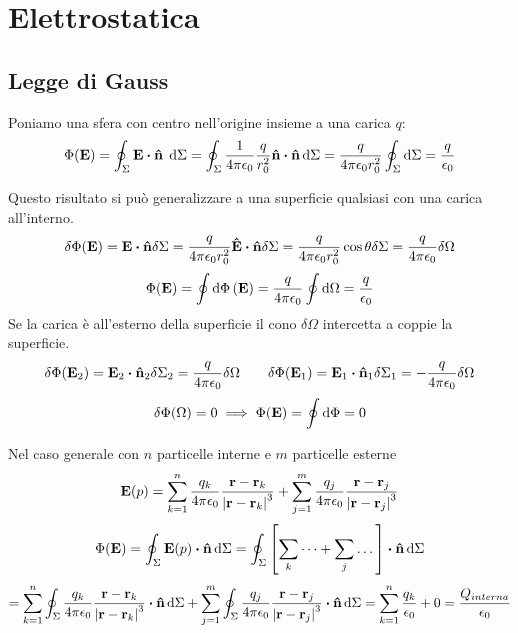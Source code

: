 \documentclass[12pt,a4paper]{article}
\begin{document}
\section{Elettrostatica}
\subsection{Legge di Gauss }
Poniamo una sfera con centro nell'origine insieme a una carica $q$:
\begin{equation*}
    \Phi(\vb{E})= \oint_\Sigma \vb{E}\vdot \vu{n} \; \dd{\Sigma} = \oint_\Sigma \frac{1}{4\pi\epsilon_0}\frac{q}{r_0^2}\vu{n}\vdot\vu{n}\dd{\Sigma}= 
    \frac{q}{4\pi\epsilon_0r_0^2}\oint_\Sigma \dd{\Sigma} = \frac{q}{\epsilon_0}
\end{equation*}

Questo risultato si può generalizzare a una superficie qualsiasi con una carica all'interno.
\begin{equation*}
    \delta\Phi(\vb{E})= \vb{E}\vdot\vu{n} \delta \Sigma = \frac{q}{4\pi\epsilon_0r_0^2}\vu{E}\vdot\vu{n} \delta\Sigma= 
     \frac{q}{4\pi\epsilon_0r_0^2}\cos \theta \delta\Sigma=  \frac{q}{4\pi\epsilon_0} \delta\Omega
\end{equation*}
\begin{equation*}
    \Phi(\vb{E})= \oint \dd{\Phi}(\vb{E})=\frac{q}{4\pi\epsilon_0} \oint\dd{\Omega} = \frac{q}{\epsilon_0}
\end{equation*}
Se la carica è all'esterno della superficie il cono $\delta\Omega$ intercetta a coppie la superficie. 
\begin{equation*}
    \delta\Phi(\vb{E}_2)= \vb{E}_2 \vdot\vu{n}_2 \delta\Sigma_2 =  \frac{q}{4\pi\epsilon_0} \delta\Omega
    \quad \quad \delta\Phi(\vb{E}_1)= \vb{E}_1 \vdot\vu{n}_1 \delta\Sigma_1 =  - \frac{q}{4\pi\epsilon_0} \delta\Omega
\end{equation*}
\begin{equation*}
    \delta\Phi(\Omega)= 0 \implies \Phi(\vb{E})= \oint \dd{\Phi}=0
\end{equation*}

Nel caso generale con $n$ particelle interne e $m$ particelle esterne
\begin{equation*}
    \vb{E}(p)= \sum_{k=1}^{n} \frac{q_k}{4\pi\epsilon_0} \frac{\vb{r}-\vb{r}_k}{\abs{\vb{r}-\vb{r}_k}^3} +
    \sum_{j=1}^{m} \frac{q_j}{4\pi\epsilon_0} \frac{\vb{r}-\vb{r}_j}{\abs{\vb{r}-\vb{r}_j}^3} 
\end{equation*}
\begin{equation*}
    \Phi(\vb{E})= \oint_\Sigma \vb{E}(p)\vdot\vu{n} \dd{\Sigma} = \oint_\Sigma \left[ \sum_k \dots + \sum_j \dots  \right]\vdot\vu{n} \dd{\Sigma} 
\end{equation*}
\begin{equation*}
    =\sum_{k=1}^{n} \oint_\Sigma\frac{q_k}{4\pi\epsilon_0} \frac{\vb{r}-\vb{r}_k}{\abs{\vb{r}-\vb{r}_k}^3} \vdot\vu{n}\dd{\Sigma} +
    \sum_{j=1}^{m} \oint_\Sigma\frac{q_j}{4\pi\epsilon_0} \frac{\vb{r}-\vb{r}_j}{\abs{\vb{r}-\vb{r}_j}^3}\vdot\vu{n} \dd{\Sigma} 
    = \sum_{k=1}^{n} \frac{q_k}{\epsilon_0} + 0 = \frac{Q_{interna}}{\epsilon_0}
\end{equation*}
\end{document}
